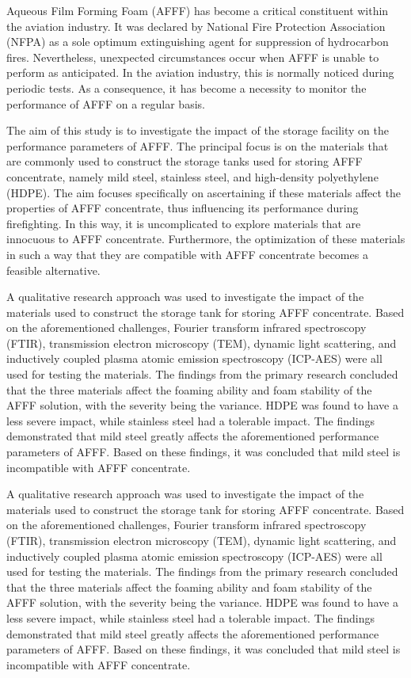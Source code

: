 Aqueous Film Forming Foam (AFFF) has become a critical constituent within the aviation industry. It was declared by National Fire Protection Association (NFPA) as a sole optimum extinguishing agent for suppression of hydrocarbon fires. Nevertheless, unexpected circumstances occur when AFFF is unable to perform as anticipated. In the aviation industry, this is normally noticed during periodic tests. As a consequence, it has become a necessity to monitor the performance of AFFF on a regular basis.

The aim of this study is to investigate the impact of the storage facility on the performance parameters of AFFF. The principal focus is on the materials that are commonly used to construct the storage tanks used for storing AFFF concentrate, namely mild steel, stainless steel, and high-density polyethylene (HDPE). The aim focuses specifically on ascertaining if these materials affect the properties of AFFF concentrate, thus influencing its performance during firefighting. In this way, it is uncomplicated to explore materials that are innocuous to AFFF concentrate. Furthermore, the optimization of these materials in such a way that they are compatible with AFFF concentrate becomes a feasible alternative.

A qualitative research approach was used to investigate the impact of the materials used to construct the storage tank for storing AFFF concentrate. Based on the aforementioned challenges, Fourier transform infrared spectroscopy (FTIR), transmission electron microscopy (TEM), dynamic light scattering, and inductively coupled plasma atomic emission spectroscopy (ICP-AES) were all used for testing the materials. The findings from the primary research concluded that the three materials affect the foaming ability and foam stability of the AFFF solution, with the severity being the variance. HDPE was found to have a less severe impact, while stainless steel had a tolerable impact. The findings demonstrated that mild steel greatly affects the aforementioned performance parameters of AFFF. Based on these findings, it was concluded that mild steel is incompatible with AFFF concentrate.

A qualitative research approach was used to investigate the impact of the materials used to construct the storage tank for storing AFFF concentrate. Based on the aforementioned challenges, Fourier transform infrared spectroscopy (FTIR), transmission electron microscopy (TEM), dynamic light scattering, and inductively coupled plasma atomic emission spectroscopy (ICP-AES) were all used for testing the materials. The findings from the primary research concluded that the three materials affect the foaming ability and foam stability of the AFFF solution, with the severity being the variance. HDPE was found to have a less severe impact, while stainless steel had a tolerable impact. The findings demonstrated that mild steel greatly affects the aforementioned performance parameters of AFFF. Based on these findings, it was concluded that mild steel is incompatible with AFFF concentrate.
